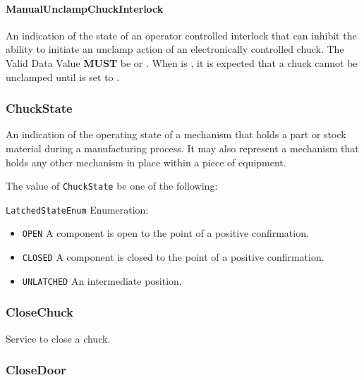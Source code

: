 \paragraph{ManualUnclampChuckInterlock}\mbox{}
\label{sec:ManualUnclampChuckInterlock}


An indication of the state of an operator controlled interlock that can inhibit the ability to initiate an unclamp action of an electronically controlled chuck.
 The \gls{Valid Data Value} \textbf{MUST} be  or . 
 When  is , it is expected that a chuck cannot be unclamped until  is set to . 


\subsubsection{ChuckState}
\label{sec:ChuckState}



An indication of the operating state of a mechanism that holds a part or stock material during a manufacturing process. It may also represent a mechanism that holds any other mechanism in place within a piece of equipment.


The value of \texttt{ChuckState} \MUST be one of the following: 


\texttt{LatchedStateEnum} Enumeration:

\begin{itemize}
\item \texttt{OPEN} \newline A component is open to the point of a positive confirmation. 
\item \texttt{CLOSED} \newline A component is closed to the point of a positive confirmation. 
\item \texttt{UNLATCHED} \newline An intermediate position. 
\end{itemize}

\FloatBarrier

\subsubsection{CloseChuck}
\label{sec:CloseChuck}



Service to close a chuck.


\subsubsection{CloseDoor}
\label{sec:CloseDoor}



